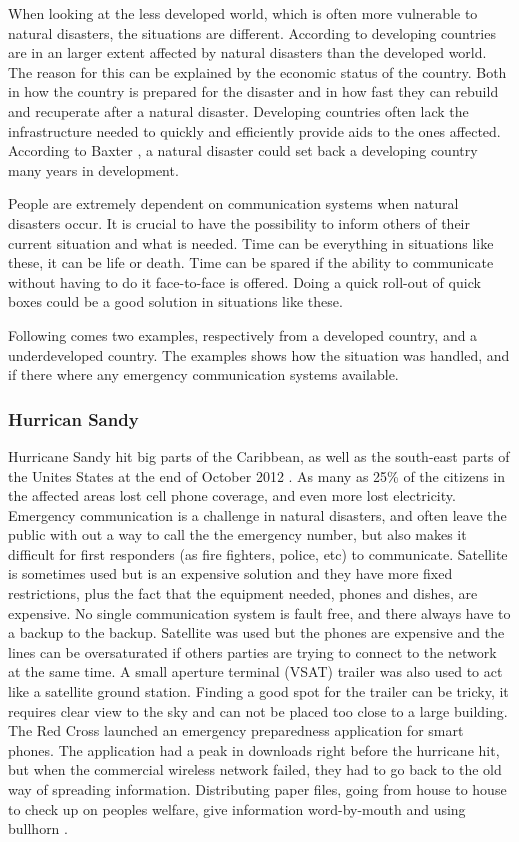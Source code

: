 When looking at the less developed world, which is often more vulnerable to natural disasters, the situations are different. According to \cite{DevelopingWorld, 360} developing countries are in an larger extent affected by natural disasters than the developed world. The reason for this can be explained by the economic status of the country. Both in how the country is prepared for the disaster and in how fast they can rebuild and recuperate after a natural disaster. Developing countries often lack the infrastructure needed to quickly and efficiently provide aids to the ones affected. According to Baxter \cite{360}, a natural disaster could set back a developing country many years in development.  

People are extremely dependent on communication systems when natural disasters occur. It is crucial to have the possibility to inform others of their current situation and what is needed. Time can be everything in situations like these, it can be life or death. Time can be spared if the ability to communicate without having to do it face-to-face is offered. Doing a quick roll-out of \gls{quick} boxes could be a good solution in situations like these. 

Following comes two examples, respectively from a developed country, and a underdeveloped country. The examples shows how the situation was handled, and if there where any emergency communication systems available. 

\subsubsection{Hurrican Sandy}
Hurricane Sandy hit big parts of the Caribbean, as well as the south-east parts of the Unites States at the end of October 2012 \cite{WikiSandy}. As many as 25\% of the citizens in the affected areas lost cell phone coverage, and even more lost electricity. Emergency communication is a challenge in natural disasters, and often leave the public with out a way to call the the emergency number, but also makes it difficult for first responders (as fire fighters, police, etc) to communicate.  Satellite is sometimes used but is an expensive solution and they have more fixed restrictions, plus the fact that the equipment needed, phones and dishes, are expensive. No single communication system is fault free, and there always have to a backup to the backup. Satellite was used but the phones are expensive and the lines can be oversaturated if others parties are trying to connect to the network at the same time. A small aperture terminal (VSAT) trailer was also used to act like a satellite ground station. Finding a good spot for the trailer can be tricky, it requires clear view to the sky and can not be placed too close to a large building. The Red Cross launched an emergency preparedness application for smart phones. The application had a peak in downloads right before the hurricane hit, but when the commercial wireless network failed, they had to go back to the old way of spreading information. Distributing paper files, going from house to house to check up on peoples welfare, give information word-by-mouth and using bullhorn \cite{hurricaneSandy}.

